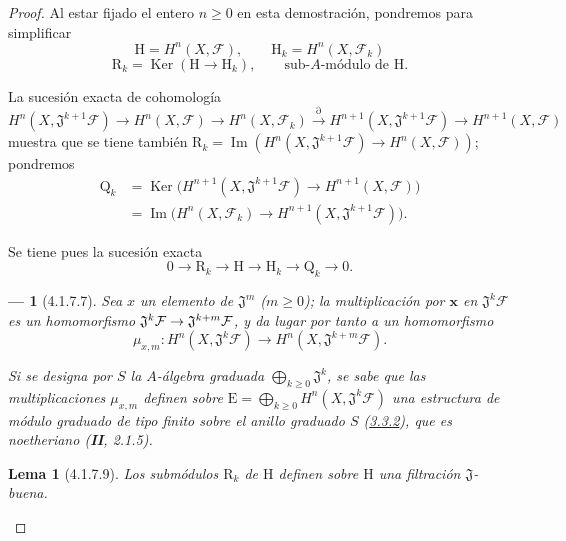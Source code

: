 \documentclass[10pt,oneside,openany]{book}
\theoremstyle{egaenv}\newtheorem*{env}{---}
\theoremstyle{egastatement}
\newtheorem*{lemma}{Lema}
\theoremstyle{egadescription}
\renewcommand{\geq}{\geqslant}
\renewcommand{\to}{\mathchoice{\longrightarrow}{\rightarrow}{\rightarrow}{\rightarrow}}
\begin{document}
\begin{proof}
Al estar fijado el entero $n\geq0$ en esta demostración, pondremos para
simplificar
\[
\mathrm H=H^n(X,\mathcal F),\qquad
\mathrm H_k=H^n(X,\mathcal F_k)
\tag{4.1.7.3}\label{III.4.1.7.3-fr}
\]
\[
\mathrm R_k=\operatorname{Ker}(\mathrm H\longrightarrow\mathrm H_k),
\qquad\text{sub-$A$-módulo de $\mathrm H$.}
\tag{4.1.7.4}\label{III.4.1.7.4-fr}
\]

La sucesión exacta de cohomología
\[
H^n(X,\mathfrak J^{k+1}\mathcal F)\longrightarrow H^n(X,\mathcal F)
\longrightarrow H^n(X,\mathcal F_k)\xrightarrow{\partial}
H^{n+1}(X,\mathfrak J^{k+1}\mathcal F)
\longrightarrow H^{n+1}(X,\mathcal F)
\]
muestra que se tiene también
$\mathrm R_k=\operatorname{Im}(
H^n(X,\mathfrak J^{k+1}\mathcal F)\longrightarrow H^n(X,\mathcal F)
)$;
pondremos
\[
\begin{aligned}
\mathrm Q_k
&=\operatorname{Ker}\bigl(H^{n+1}(X,\mathfrak J^{k+1}\mathcal F)
\longrightarrow H^{n+1}(X,\mathcal F)\bigr)\\
&=\operatorname{Im}\bigl(H^n(X,\mathcal F_k)
\longrightarrow H^{n+1}(X,\mathfrak J^{k+1}\mathcal F)\bigr).
\end{aligned}
\tag{4.1.7.5}\label{III.4.1.7.5-fr}
\]

Se tiene pues la sucesión exacta
\[
0\longrightarrow\mathrm R_k\longrightarrow\mathrm H
\longrightarrow\mathrm H_k\longrightarrow\mathrm Q_k\longrightarrow0.
\tag{4.1.7.6}\label{III.4.1.7.6-fr}
\]

\begin{env}[4.1.7.7]
\label{III.4.1.7.7-fr}
Sea $x$ un elemento de $\mathfrak J^m$ ($m\geq0$); la multiplicación por
$\boldsymbol{x}$ en $\mathfrak J^k\mathcal F$ es un homomorfismo
$\mathfrak J^k\mathcal F\to\mathfrak J^{k+m}\mathcal F$, y da lugar
por tanto a un homomorfismo
\[
\mu_{x,m}:H^n(X,\mathfrak J^k\mathcal F)
\longrightarrow H^n(X,\mathfrak J^{k+m}\mathcal F).
\tag{4.1.7.8}\label{III.4.1.7.8-fr}
\]

Si se designa por $S$ la $A$-álgebra graduada
$\bigoplus_{k\geq0}\mathfrak J^k$, se sabe que las multiplicaciones
$\mu_{x,m}$ definen sobre
$\mathrm E=\bigoplus_{k\geq0}H^n(X,\mathfrak J^k\mathcal F)$ una
estructura de \emph{módulo graduado de tipo finito} sobre el anillo graduado $S$
(\hyperref[III.3.3.2-fr]{3.3.2}), que es \emph{noetheriano} (\textbf{II}, 2.1.5).
\end{env}

\begin{lemma}[4.1.7.9]
\label{III.4.1.7.9-fr}
Los submódulos $\mathrm R_k$ de $\mathrm H$ definen sobre $\mathrm H$
una filtración $\mathfrak J$-buena.
\end{lemma}


\end{proof}
\end{document}
